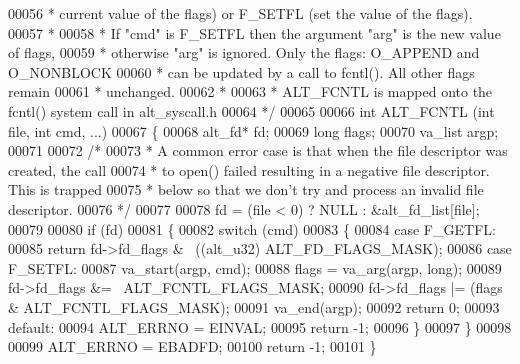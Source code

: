 \begin{DoxyCode}
00056 \textcolor{comment}{ * current value of the flags) or F\_SETFL (set the value of the flags).}
00057 \textcolor{comment}{ *}
00058 \textcolor{comment}{ * If "cmd" is F\_SETFL then the argument "arg" is the new value of flags,}
00059 \textcolor{comment}{ * otherwise "arg" is ignored. Only the flags: O\_APPEND and O\_NONBLOCK}
00060 \textcolor{comment}{ * can be updated by a call to fcntl(). All other flags remain}
00061 \textcolor{comment}{ * unchanged.}
00062 \textcolor{comment}{ *}
00063 \textcolor{comment}{ * ALT\_FCNTL is mapped onto the fcntl() system call in alt\_syscall.h}
00064 \textcolor{comment}{ */}
00065  
00066 \textcolor{keywordtype}{int} ALT_FCNTL (\textcolor{keywordtype}{int} file, \textcolor{keywordtype}{int} cmd, ...)
00067 \{ 
00068   alt_fd*  fd;
00069   \textcolor{keywordtype}{long}     flags;
00070   va\_list  argp;
00071 
00072   \textcolor{comment}{/*}
00073 \textcolor{comment}{   * A common error case is that when the file descriptor was created, the call}
00074 \textcolor{comment}{   * to open() failed resulting in a negative file descriptor. This is trapped}
00075 \textcolor{comment}{   * below so that we don't try and process an invalid file descriptor.}
00076 \textcolor{comment}{   */}
00077 
00078   fd = (file < 0) ? NULL : &alt_fd_list[file];
00079   
00080   \textcolor{keywordflow}{if} (fd)
00081   \{
00082     \textcolor{keywordflow}{switch} (cmd)
00083     \{
00084     \textcolor{keywordflow}{case} F\_GETFL:
00085       \textcolor{keywordflow}{return} fd->fd_flags & ~((alt_u32) ALT_FD_FLAGS_MASK);
00086     \textcolor{keywordflow}{case} F\_SETFL:
00087       va\_start(argp, cmd);
00088       flags = va\_arg(argp, \textcolor{keywordtype}{long});
00089       fd->fd_flags &= ~ALT_FCNTL_FLAGS_MASK;
00090       fd->fd_flags |= (flags & ALT_FCNTL_FLAGS_MASK);
00091       va\_end(argp);
00092       \textcolor{keywordflow}{return} 0;
00093     \textcolor{keywordflow}{default}:
00094       ALT_ERRNO = EINVAL;
00095       \textcolor{keywordflow}{return} -1;
00096     \}
00097   \}
00098 
00099   ALT_ERRNO = EBADFD;
00100   \textcolor{keywordflow}{return} -1;
00101 \}
\end{DoxyCode}
